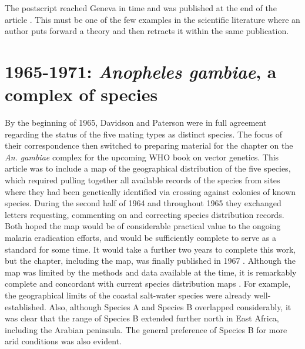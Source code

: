\documentclass[a4paper,11pt,abstracton,hidelinks]{scrartcl}
\begin{document}
The postscript reached Geneva in time and was published at the end of the article \citep{Davidson1964}. This must be one of the few examples in the scientific literature where an author puts forward a theory and then retracts it within the same publication.


\section{1965-1971: \textit{Anopheles gambiae}, a complex of species}


By the beginning of 1965, Davidson and Paterson were in full agreement regarding the status of the five mating types as distinct species. 
The focus of their correspondence then switched to preparing material for the chapter on the \textit{An. gambiae} complex for the upcoming WHO book on vector genetics. 
This article was to include a map of the geographical distribution of the five species, which required pulling together all available records of the species from sites where they had been genetically identified via crossing against colonies of known species. 
During the second half of 1964 and throughout 1965 they exchanged letters requesting, commenting on and correcting species distribution records. 
Both hoped the map would be of considerable practical value to the ongoing malaria eradication efforts, and would be sufficiently complete to serve as a standard for some time. 
It would take a further two years to complete this work, but the chapter, including the map, was finally published in 1967 \citep{Davidson1967}. 
Although the map was limited by the methods and data available at the time, it is remarkably complete and concordant with current species distribution maps \citep{Wiebe2017}. 
For example, the geographical limits of the coastal salt-water species were already well-established. 
Also, although Species A and Species B overlapped considerably, it was clear that the range of Species B extended further north in East Africa, including the Arabian peninsula.
The general preference of Species B for more arid conditions was also evident.
\end{document}
